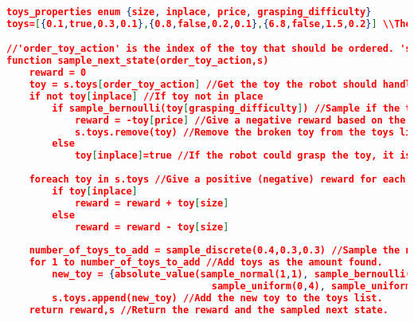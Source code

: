\begin{lstlisting}[floatplacement=h,numbersymbol=$:$,language=json,caption={The Room Cleaning domain in pseudo PPL code.},label={lst:openWorld_PPL},basicstyle=\tiny]
toys_properties enum {size, inplace, price, grasping_difficulty}
toys=[{0.1,true,0.3,0.1},{0.8,false,0.2,0.1},{6.8,false,1.5,0.2}] \\The 'toys' list is the only state variable.

//'order_toy_action' is the index of the toy that should be ordered. 's' is the state we want to sample (the next state and reward) from. 
function sample_next_state(order_toy_action,s) 
    reward = 0
    toy = s.toys[order_toy_action] //Get the toy the robot should handle.
    if not toy[inplace] //If toy not in place
        if sample_bernoulli(toy[grasping_difficulty]) //Sample if the toy falls and breaks based on its grasping difficulty.
            reward = -toy[price] //Give a negative reward based on the toy price.
            s.toys.remove(toy) //Remove the broken toy from the toys list.
        else
            toy[inplace]=true //If the robot could grasp the toy, it is said to be in place.
 
    foreach toy in s.toys //Give a positive (negative) reward for each toy (not) in place by its size.
        if toy[inplace]
            reward = reward + toy[size]
        else
            reward = reward - toy[size]
            
    number_of_toys_to_add = sample_discrete(0.4,0.3,0.3) //Sample the number of new toys found (zero:0.4, one:0.3, or two:0.3). 
    for 1 to number_of_toys_to_add //Add toys as the amount found.
        new_toy = {absolute_value(sample_normal(1,1), sample_bernoulli(0.2),
                                    sample_uniform(0,4), sample_uniform(0,0.4)} //Sample the new toy properties.
        s.toys.append(new_toy) //Add the new toy to the toys list.
    return reward,s //Return the reward and the sampled next state.
\end{lstlisting} 